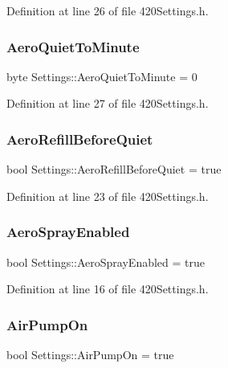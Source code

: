 Definition at line 26 of file 420\+Settings.\+h.

\mbox{\label{struct_settings_a70a24474e56d2274e32f54dc42337d72}} 
\subsubsection{\texorpdfstring{AeroQuietToMinute}{AeroQuietToMinute}}
{\footnotesize\ttfamily byte Settings\+::\+Aero\+Quiet\+To\+Minute = 0}



Definition at line 27 of file 420\+Settings.\+h.

\mbox{\label{struct_settings_a4e5a318be53e6c2ef9cb0a6d88bea1f9}} 
\subsubsection{\texorpdfstring{AeroRefillBeforeQuiet}{AeroRefillBeforeQuiet}}
{\footnotesize\ttfamily bool Settings\+::\+Aero\+Refill\+Before\+Quiet = true}



Definition at line 23 of file 420\+Settings.\+h.

\mbox{\label{struct_settings_a95e8143a34a0ef0ae5ff6a11e8f32bc7}} 
\subsubsection{\texorpdfstring{AeroSprayEnabled}{AeroSprayEnabled}}
{\footnotesize\ttfamily bool Settings\+::\+Aero\+Spray\+Enabled = true}



Definition at line 16 of file 420\+Settings.\+h.

\mbox{\label{struct_settings_a0b251103f111ebc2f63461b85f77ccd5}} 
\subsubsection{\texorpdfstring{AirPumpOn}{AirPumpOn}}
{\footnotesize\ttfamily bool Settings\+::\+Air\+Pump\+On = true}



